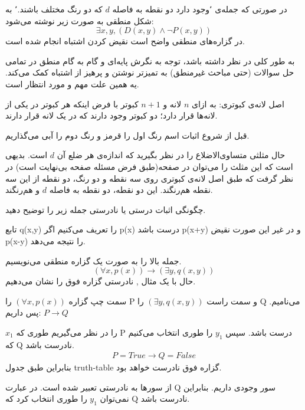\documentclass[11pt,largemargins]{h2wp}
\begin{document}
در صورتی که جمله‌ی ٬وجود دارد دو نقطه به فاصله $d$ که دو رنگ مختلف باشند.٬ به شکل منطقی به صورت زیر نوشته می‌شود:
$$ \exists x,y, (D(x,y) \wedge \neg P(x,y)) $$ 
در گزاره‌های منطقی واضح است نقیض کردن اشتباه انجام شده است.


به‌ طور کلی در نظر داشته باشد، توجه به نگرش پایه‌ای و گام به گام منطق در تمامی حل سوالات (حتی مباحث غیرمنطق) به تمیزتر نوشتن و پرهیز از اشتباه کمک می‌کند. یه همین علت مهم و مورد انتظار است.


 
    اصل لانه‌ی کبوتری: به ازای 
    $n$
    لانه و 
    $n+1$
    کبوتر با فرض اینکه هر کبوتر در یکی از لانه‌ها قرار دارد؛ دو کبوتر وجود دارند که در یک لانه قرار دارند.

    قبل از شروع اثبات اسم رنگ اول را قرمز و رنگ دوم را آبی می‌گذاریم.

    حال مثلثی متساوی‌الاضلاع را در نظر بگیرید که اندازه‌ی هر ضلع آن
    $d$
    است. بدیهی است که این مثلث را می‌توان در صفحه‌(طبق فرض مسئله صفحه بی‌نهایت است)
    در نظر گرفت که طبق اصل لانه‌ی کبوتری روی سه نقطه و دو رنگ، دو نقطه از این سه نقطه هم‌ر‌‌نگند.
    این دو نقطه،
    دو نقطه به فاصله
    $d$
    و هم‌رنگند.
    
 \notes
 
    
  \question

چگونگی اثبات درستی یا نادرستی جمله زیر را توضیح دهید.

 تابع q(x,y) را تعریف می‌کنیم اگر p(x) درست باشد p(x+y) و در غیر این صورت نقیض p(x-y) را نتیجه می‌دهد. 
  
 
 
 \solution
 
 جمله بالا را به صورت یک گزاره منطقی می‌نویسیم.
  $$  (\forall x,p(x)) \rightarrow (\exists y, q(x,y)) $$
  حال با یک مثال , نادرستی گزاره فوق را نشان می‌دهیم.
  
 سمت چپ گزاره 
 $(\forall x,p(x))$
 را P
و سمت راست 
$ (\exists y, q(x,y)) $
را Q می‌نامیم.
پس داریم:
$ P \rightarrow Q $


$x_1$
را در نظر می‌گیریم طوری که P درست باشد.
 سپس 
$ y_1 $
را طوری انتخاب می‌کنیم که Q نادرست باشد.
\begin{align*}
 P=True \rightarrow Q=False
\end{align*}
بنابراین طبق جدول truth-table
گزاره فوق نادرست خواهد بود.



 \notes
 
 از سورها به نادرستی تعبیر شده است. در عبارت Q سور وجودی داریم. بنابراین نمی‌توان $ y_1 $
را طوری انتخاب کرد که Q نادرست باشد.
 
\end{document}

